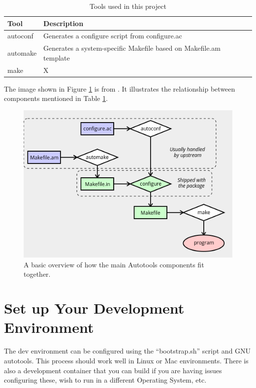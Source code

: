 \begin{table}[ht]
	\centering
	\begin{tabular}{|l|l|}\hline
		Tool & Description \\\hline
		autoconf & Generates a configure script from configure.ac   \\\hline
		automake & Generates a system-specific Makefile based on Makefile.am template    \\\hline
		make  &   X    \\\hline
	\end{tabular}
	\caption{Tools used in this project}
	\label{Autotools}
\end{table}
\vspace{2mm}

\justifying
The image shown in Figure \ref{diagram} is from \cite{autobasics}.
It illustrates the relationship between components mentioned in Table \ref{Autotools}.
\vspace{2mm}

\begin{figure}[ht]
	\includegraphics[width=12cm]{images/diagram.png}
	\caption{A basic overview of how the main Autotools components fit together.}
	\label{diagram}
\end{figure}
\vspace{2mm}

\section{\label{sec:dev-env}Set up Your Development Environment}

\justifying
The dev environment can be configured using the ``bootstrap.sh'' script and GNU autotools. This process should work well in Linux or Mac environments. There is also a development container that you can build if you are having
issues configuring these, wish to run in a different Operating System, etc.

